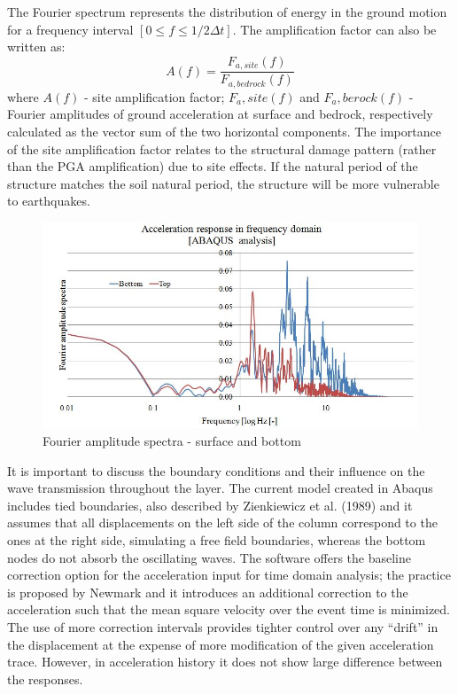 	The Fourier spectrum represents the distribution of energy in the ground motion for a frequency interval $[0 ≤ f ≤ 1/2\Delta t]$. The amplification factor can also be written as:
	\begin{equation}
	A(f)=\frac{F_{a,site}(f)}{F_{a,bedrock}(f)}
	\end{equation}
	where $A(f)$ - site amplification factor; $F_a,site(f)$ and $F_a,berock(f)$ - Fourier amplitudes of ground acceleration at surface and bedrock, respectively calculated as the vector sum of the two horizontal components. The importance of the site amplification factor relates to the structural damage pattern (rather than the PGA amplification) due to site effects. If the natural period of the structure matches the soil natural period, the structure will be more vulnerable to earthquakes. 
	\begin{figure}[h!]
		\centering
		\includegraphics[width=0.7\linewidth]{"Fourier"}
		\caption{Fourier amplitude spectra - surface and bottom}
		\label{fourier}
	\end{figure}
	
	It is important to discuss the boundary conditions and their influence on the wave transmission throughout the layer. The current model created in Abaqus includes tied boundaries, also described by Zienkiewicz et al. (1989) \cite{zienkiewicz1989earthquake} and it assumes that all displacements on the left side of the column correspond to the ones at the right side, simulating a free field boundaries, whereas the bottom nodes do not absorb the oscillating waves. The software offers the baseline correction option for the acceleration input for time domain analysis; the practice is proposed by Newmark \cite{newmark1959method} and it introduces an additional correction to the acceleration such that the mean square velocity over the event time is minimized. The use of more correction intervals provides tighter control over any “drift” in the displacement at the expense of more modification of the given acceleration trace. However, in acceleration history it does not show large difference between the responses.
	
